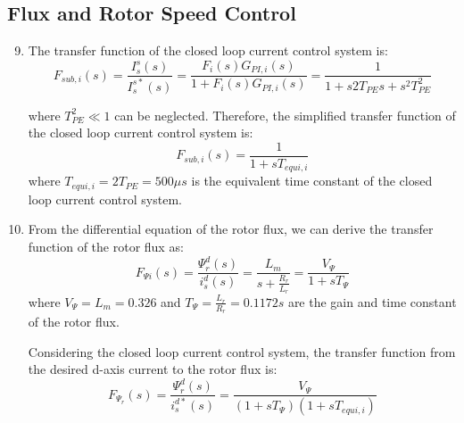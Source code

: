 \documentclass[12pt,a4paper, openany]{book}
\begin{document}
\subsection{ Flux and Rotor Speed Control}
\begin{enumerate}
\setcounter{enumi}{8}
\item 
The transfer function of the closed loop current control system is:
\begin{equation}
    F_{sub,i}(s)=\frac{I_s^s(s)}{I_s^{s*}(s)}=\frac{F_i(s)G_{PI,i}(s)}{1+F_i(s)G_{PI,i}(s)}=\frac{1}{1+s2T_{PE}s+s^2T^2_{PE}}
\end{equation}

where $T^2_{PE} \ll 1$ can be neglected. Therefore, the simplified transfer function of the closed loop current control system is:
\begin{equation}
    F_{sub,i}(s)=\frac{1}{1+sT_{equi,i}}
\end{equation}
where $T_{equi,i}=2T_{PE}=500\mu s$ is the equivalent time constant of the closed loop current control system.
\item 
From the differential equation of the rotor flux, we can derive the transfer function of the rotor flux as:
\begin{equation}
    F_{\Psi i}(s)=\frac{\Psi_r^d(s)}{i_s^{d}(s)}=\frac{L_m}{s+\frac{R_r}{L_r}}=\frac{V_{\Psi}}{1+sT_{\Psi}}
\end{equation}
where $V_{\Psi}=L_m=0.326$ and $T_{\Psi}=\frac{L_r}{R_r}=0.1172s$ are the gain and time constant of the rotor flux.

Considering the closed loop current control system, the transfer function from the desired d-axis current to the rotor flux is:
\begin{equation}
    F_{\Psi_r}(s)=\frac{\Psi_r^d(s)}{i_s^{d*}(s)}=\frac{V_{\Psi}}{(1+sT_{\Psi})(1+sT_{equi,i})}
\end{equation}


\end{enumerate}
\end{document}

